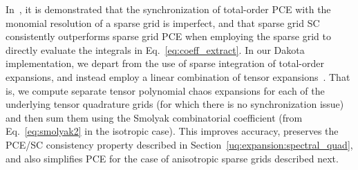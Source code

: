 In~\cite{Eld09a}, it is demonstrated that the synchronization of
total-order PCE with the monomial resolution of a sparse grid is
imperfect, and that sparse grid SC consistently outperforms sparse
grid PCE when employing the sparse grid to directly evaluate the
integrals in Eq.~\ref{eq:coeff_extract}.  In our Dakota implementation, we 
depart from the use of sparse integration of total-order expansions, and 
instead employ a linear combination of tensor expansions~\cite{ConstSSG}.
That is, we compute separate tensor polynomial chaos expansions for
each of the underlying tensor quadrature grids (for which there is no
synchronization issue) and then sum them using the Smolyak
combinatorial coefficient (from Eq.~\ref{eq:smolyak2} in the isotropic
case).  This improves accuracy, preserves the PCE/SC consistency
property described in Section~\ref{uq:expansion:spectral_quad}, and also
simplifies PCE for the case of anisotropic sparse grids described next.

